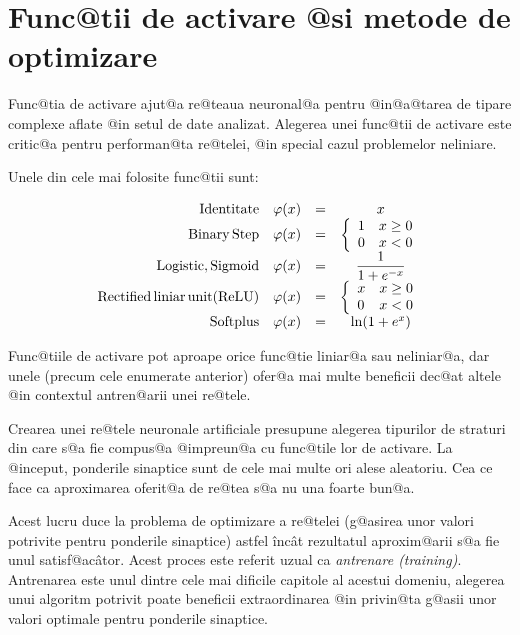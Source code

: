 



\section{Func@tii de activare @si metode de optimizare}
Func@tia de activare ajut@a re@teaua neuronal@a pentru @in@a@tarea de tipare complexe aflate @in setul de date analizat. Alegerea unei func@tii de activare este critic@a pentru performan@ta re@telei, @in special cazul problemelor neliniare.

Unele din cele mai folosite func@tii sunt:

$$
\begin{array}{rlcc}
	{\rm Identitate} & \varphi (x) &=& x \\
	{\rm Binary \, Step} & \varphi (x) &=& \left\lbrace
		\begin{array}{lc}
			1 & x \geq 0 \\
			0 & x < 0
		\end{array}
	\right. \\
	{\rm Logistic, Sigmoid} & \varphi (x) &=& \displaystyle\frac{1}{1 + e^{-x}} \\
	{\rm Rectified\, liniar\, unit (ReLU)}& \varphi (x) &=& \left\lbrace
		\begin{array}{lc}
			x & x \geq 0 \\
			0 & x < 0
		\end{array}
	\right. \\
	{\rm Softplus} & \varphi (x) &=& \ln ( 1 + e^x) \\
\end{array}
$$

Func@tiile de activare pot aproape orice func@tie liniar@a sau neliniar@a, dar unele  (precum cele enumerate anterior) ofer@a mai multe beneficii dec@at altele @in contextul antren@arii unei re@tele.

Crearea unei re@tele neuronale artificiale presupune alegerea tipurilor de straturi din care s@a fie compus@a @impreun@a cu func@tile lor de activare. La @inceput, ponderile sinaptice sunt de cele mai multe ori alese aleatoriu. Cea ce face ca aproximarea oferit@a de re@tea s@a nu una foarte bun@a.

Acest lucru duce la problema de optimizare a re@telei (g@asirea unor valori potrivite pentru ponderile sinaptice) astfel \^inc\^ at rezultatul aproxim@arii s@a fie unul satisf@ac\^ ator. Acest proces este referit uzual ca {\sl antrenare (training)}. Antrenarea este unul dintre cele mai dificile capitole al acestui domeniu, alegerea unui algoritm potrivit poate beneficii extraordinarea @in privin@ta g@asii unor valori optimale pentru ponderile sinaptice.

